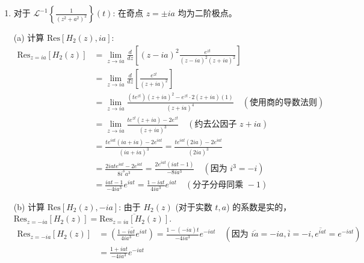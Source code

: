 \documentclass[linespread=1.5,openany]{book}%
\def\diff{d}%
\theoremstyle{plain}
\newcommand{\diff}{\mathop{}\!\mathrm{d}}  %
\begin{document}
{{{{{{{\begin{enumerate}
										\item 对于 $\mathcal{L}^{-1}\left\{\frac{1}{(z^2+a^2)^2}\right\}(t)$:
										在奇点 $z=\pm ia$ 均为二阶极点。
										
										(a) 计算 $\text{Res}[H_2(z), ia]$:
										\begin{align*}
											\text{Res}_{z=ia} [H_2(z)] &= \lim_{z\to ia} \frac{\diff}{\diff z} \left[ (z-ia)^2 \frac{e^{zt}}{(z-ia)^2(z+ia)^2} \right] \\[6pt]
											&= \lim_{z\to ia} \frac{\diff}{\diff z} \left[ \frac{e^{zt}}{(z+ia)^2} \right] \\[6pt]
											&= \lim_{z\to ia} \frac{(te^{zt})(z+ia)^2 - e^{zt} \cdot 2(z+ia)(1)}{(z+ia)^4} \quad (\text{使用商的导数法则}) \\[6pt]
											&= \lim_{z\to ia} \frac{te^{zt}(z+ia) - 2e^{zt}}{(z+ia)^3} \quad (\text{约去公因子 } z+ia) \\[6pt]
											&= \frac{te^{iat}(ia+ia) - 2e^{iat}}{(ia+ia)^3} = \frac{te^{iat}(2ia) - 2e^{iat}}{(2ia)^3} \\[6pt]
											&= \frac{2iate^{iat} - 2e^{iat}}{8i^3a^3} = \frac{2e^{iat}(iat-1)}{-8ia^3} \quad (\text{因为 } i^3=-i) \\[6pt]
											&= \frac{iat-1}{-4ia^3}e^{iat} = \frac{1-iat}{4ia^3}e^{iat} \quad (\text{分子分母同乘 } -1)
										\end{align*}
										
										(b) 计算 $\text{Res}[H_2(z), -ia]$:
										由于 $H_2(z)$ (对于实数 $t,a$) 的系数是实的，$\text{Res}_{z=-ia} [H_2(z)] = \overline{\text{Res}_{z=ia} [H_2(z)]}$.
										\begin{align*}
											\text{Res}_{z=-ia} [H_2(z)] &= \overline{\left(\frac{1-iat}{4ia^3}e^{iat}\right)} = \frac{1-(-ia)t}{-4ia^3}e^{-iat} \quad (\text{因为 } \overline{ia}=-ia, \overline{i}=-i, \overline{e^{iat}}=e^{-iat}) \\[6pt]
											&= \frac{1+iat}{-4ia^3}e^{-iat}
										\end{align*}
										

\end{enumerate}}}}}}}}
\end{document}
